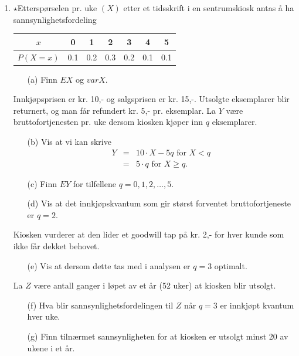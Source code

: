 \begin{enumerate}
\item $\star$Etterspørselen pr. uke $(X)$ etter et tidsskrift i en
     sentrumskiosk antas å ha sannsynlighetsfordeling
     \begin{center}
     \begin{tabular}{c|cccccc}
      $x$    &  0 &  1  &  2  &  3  &  4  &  5 \\ \hline
     $P(X=x)$&0.1 & 0.2 & 0.3 & 0.2 & 0.1 & 0.1 
     \end{tabular}
     \end{center}
     \begin{itemize}
     \item[(a)]  Finn $EX$ og $varX$.
     \end{itemize}
     Innkjøpsprisen er kr. 10,- og salgsprisen er kr. 15,-.
     Utsolgte eksemplarer blir returnert, og man får refundert
     kr. 5,- pr. eksemplar. La $Y$ være bruttofortjenesten pr.
     uke dersom kiosken kjøper inn $q$ eksemplarer.
     \begin{itemize}
     \item[(b)]  Vis at vi kan skrive
     \begin{eqnarray*}
            Y&=&10\cdot X-5q   \mbox{\ \ for \ \ } X<q \\
             &=&5\cdot q   \mbox{\ \ \ \ \ \ for \ \ } X\geq q.
     \end{eqnarray*}
     \item[(c)]  Finn $EY$ for tilfellene $q=0, 1, 2, \ldots, 5$.
     \item[(d)]  Vis at det innkjøpskvantum som gir størst forventet
          bruttofortjeneste er $q=2$.
     \end{itemize}
     Kiosken vurderer at den lider et goodwill tap på kr. 2,- for
     hver kunde som ikke får dekket behovet.
     \begin{itemize}
     \item[(e)]  Vis at dersom dette tas med i analysen er $q=3$ optimalt. 
     \end{itemize}
     La $Z$ være antall ganger i løpet av et år (52 uker) at
     kiosken blir utsolgt.
     \begin{itemize}
     \item[(f)]  Hva blir sannsynlighetsfordelingen til $Z$ når  $q=3$
     er innkjøpt kvantum hver uke.
     \item[(g)]  Finn tilnærmet sannsynligheten for at kiosken er
          utsolgt minst 20 av ukene i et år.
     \end{itemize}


\end{enumerate}
